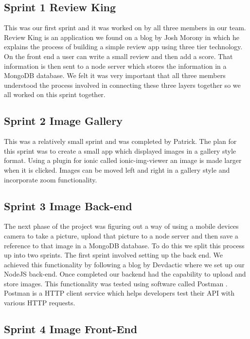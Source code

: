 \subsection{Sprint 1 Review King}
This was our first sprint and it was worked on by all three members in our team. Review King is an application we found on a blog by Josh Morony \cite{ReviewKing} in which he explains the process of building a simple review app using three tier technology. On the front end a user can write a small review and then add a score. That information is then sent to a node server which stores the information in a MongoDB database.  We felt it was very important that all three members understood the process involved in connecting these three layers together so we all worked on this sprint together.  

\subsection{Sprint 2 Image Gallery}
This was a relatively small sprint and was completed by Patrick. The plan for this sprint was to create a small app which displayed images in a gallery style format. Using a plugin for ionic called ionic-img-viewer \cite{ImgViwer} an image is made larger when it is clicked. Images can be moved left and right in a gallery style and incorporate zoom functionality.

\subsection{Sprint 3 Image Back-end}
The next phase of the project was figuring out a way of using a mobile devices camera to take a picture, upload that picture to a node server and then save a reference to that image in a MongoDB database. To do this we split this process up into two sprints. The first sprint involved setting up the back end. We achieved this functionality by following a blog by Devdactic \cite{ImageBackEnd} where we set up our NodeJS back-end. Once completed our backend had the capability to upload and store images. This functionality was tested using software called Postman \cite{Postman}. Postman is a HTTP client service which helps developers test their API with various HTTP requests. \\

\subsection{Sprint 4 Image Front-End}

